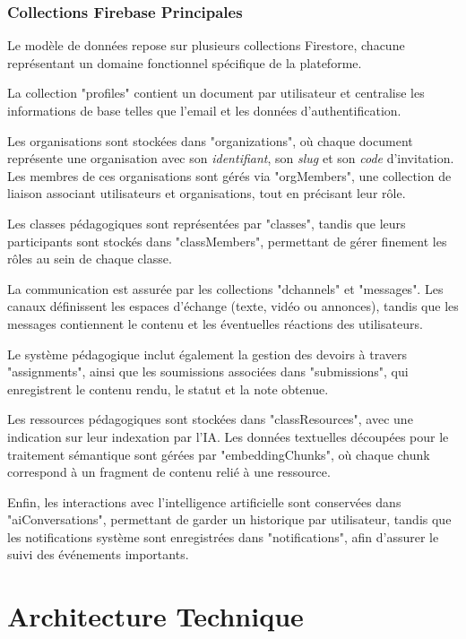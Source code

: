 \documentclass[12pt, a4paper, twoside]{report}
\begin{document}
\subsection{Collections Firebase Principales}

Le modèle de données repose sur plusieurs collections Firestore, chacune représentant un domaine fonctionnel spécifique de la plateforme.

La collection "profiles" contient un document par utilisateur et centralise les informations de base telles que l'email et les données d'authentification.

Les organisations sont stockées dans "organizations", où chaque document représente une organisation avec son \textit{identifiant}, son \textit{slug} et son \textit{code} d'invitation. Les membres de ces organisations sont gérés via "orgMembers", une collection de liaison associant utilisateurs et organisations, tout en précisant leur rôle.

Les classes pédagogiques sont représentées par "classes", tandis que leurs participants sont stockés dans "classMembers", permettant de gérer finement les rôles au sein de chaque classe.

La communication est assurée par les collections "dchannels" et "messages". Les canaux définissent les espaces d'échange (texte, vidéo ou annonces), tandis que les messages contiennent le contenu et les éventuelles réactions des utilisateurs.

Le système pédagogique inclut également la gestion des devoirs à travers "assignments", ainsi que les soumissions associées dans "submissions", qui enregistrent le contenu rendu, le statut et la note obtenue.

Les ressources pédagogiques sont stockées dans "classResources", avec une indication sur leur indexation par l'IA. Les données textuelles découpées pour le traitement sémantique sont gérées par "embeddingChunks", où chaque chunk correspond à un fragment de contenu relié à une ressource.

Enfin, les interactions avec l'intelligence artificielle sont conservées dans "aiConversations", permettant de garder un historique par utilisateur, tandis que les notifications système sont enregistrées dans "notifications", afin d'assurer le suivi des événements importants.

\chapter{Architecture Technique}
\end{document}
